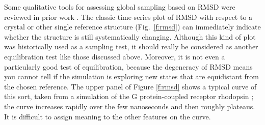 
Some qualitative tools for assessing global sampling based on RMSD were reviewed
in prior work \cite{Grossfield2009}.   The classic time-series plot of RMSD with
respect to a crystal or other single reference structure (Fig.\ \ref{f:rmsd}) can immediately
indicate whether the structure is still systematically changing.  Although this
kind of plot was historically used as a sampling test, it should really be
considered as another equilibration test like those discussed above.  Moreover,
it is not even a particularly good test of equilibration, because the degeneracy
of RMSD means you cannot tell if the simulation is exploring new states that are
equidistant from the chosen reference.  The upper panel of Figure \ref{f:rmsd}
shows a typical curve of this sort, taken from a simulation of the G
protein-coupled receptor rhodopsin \cite{Grossfield-2015}; the curve increases
rapidly over the few nanoseconds and then roughly plateaus.  It is difficult to
assign meaning to the other features on the curve.

